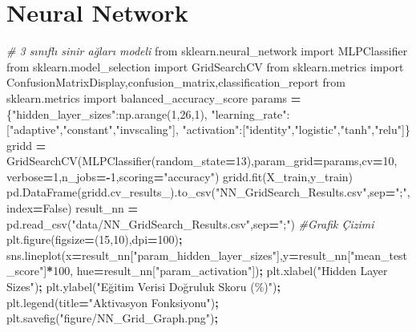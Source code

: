 \documentclass[12pt,twoside]{deuthesis}
\newenvironment{Shaded}{\begin{snugshade}}{\end{snugshade}}
\newcommand{\CommentTok}[1]{\textcolor[rgb]{0.56,0.35,0.01}{\textit{#1}}}
\newcommand{\DecValTok}[1]{\textcolor[rgb]{0.00,0.00,0.81}{#1}}
\newcommand{\ImportTok}[1]{#1}
\newcommand{\NormalTok}[1]{#1}
\newcommand{\OperatorTok}[1]{\textcolor[rgb]{0.81,0.36,0.00}{\textbf{#1}}}
\newcommand{\StringTok}[1]{\textcolor[rgb]{0.31,0.60,0.02}{#1}}
\newcommand{\VariableTok}[1]{\textcolor[rgb]{0.00,0.00,0.00}{#1}}
\begin{document}
\hypertarget{neural-network}{%
\section{Neural Network}\label{neural-network}}

\scriptsize
\begin{Shaded}
\begin{Highlighting}[]
\CommentTok{\# 3 sınıflı sinir ağları modeli}
\ImportTok{from}\NormalTok{ sklearn.neural\_network }\ImportTok{import}\NormalTok{ MLPClassifier}
\ImportTok{from}\NormalTok{ sklearn.model\_selection }\ImportTok{import}\NormalTok{ GridSearchCV}
\ImportTok{from}\NormalTok{ sklearn.metrics }\ImportTok{import}\NormalTok{ ConfusionMatrixDisplay,confusion\_matrix,classification\_report}
\ImportTok{from}\NormalTok{ sklearn.metrics }\ImportTok{import}\NormalTok{ balanced\_accuracy\_score}
\NormalTok{params }\OperatorTok{=}\NormalTok{ \{}\StringTok{"hidden\_layer\_sizes"}\NormalTok{:np.arange(}\DecValTok{1}\NormalTok{,}\DecValTok{26}\NormalTok{,}\DecValTok{1}\NormalTok{),}
          \StringTok{"learning\_rate"}\NormalTok{:[}\StringTok{"adaptive"}\NormalTok{,}\StringTok{"constant"}\NormalTok{,}\StringTok{"invscaling"}\NormalTok{],}
          \StringTok{"activation"}\NormalTok{:[}\StringTok{"identity"}\NormalTok{,}\StringTok{"logistic"}\NormalTok{,}\StringTok{"tanh"}\NormalTok{,}\StringTok{"relu"}\NormalTok{]\}}
\NormalTok{gridd }\OperatorTok{=}\NormalTok{ GridSearchCV(MLPClassifier(random\_state}\OperatorTok{=}\DecValTok{13}\NormalTok{),param\_grid}\OperatorTok{=}\NormalTok{params,cv}\OperatorTok{=}\DecValTok{10}\NormalTok{,}
\NormalTok{                                   verbose}\OperatorTok{=}\DecValTok{1}\NormalTok{,n\_jobs}\OperatorTok{={-}}\DecValTok{1}\NormalTok{,scoring}\OperatorTok{=}\StringTok{"accuracy"}\NormalTok{)}
\NormalTok{gridd.fit(X\_train,y\_train)                                  }
\NormalTok{pd.DataFrame(gridd.cv\_results\_).to\_csv(}\StringTok{"NN\_GridSearch\_Results.csv"}\NormalTok{,sep}\OperatorTok{=}\StringTok{";"}\NormalTok{,index}\OperatorTok{=}\VariableTok{False}\NormalTok{)}
\NormalTok{result\_nn }\OperatorTok{=}\NormalTok{ pd.read\_csv(}\StringTok{"data/NN\_GridSearch\_Results.csv"}\NormalTok{,sep}\OperatorTok{=}\StringTok{";"}\NormalTok{)}
\CommentTok{\#Grafik Çizimi}
\NormalTok{plt.figure(figsize}\OperatorTok{=}\NormalTok{(}\DecValTok{15}\NormalTok{,}\DecValTok{10}\NormalTok{),dpi}\OperatorTok{=}\DecValTok{100}\NormalTok{)}\OperatorTok{;}
\NormalTok{sns.lineplot(x}\OperatorTok{=}\NormalTok{result\_nn[}\StringTok{"param\_hidden\_layer\_sizes"}\NormalTok{],y}\OperatorTok{=}\NormalTok{result\_nn[}\StringTok{"mean\_test\_score"}\NormalTok{]}\OperatorTok{*}\DecValTok{100}\NormalTok{,}
\NormalTok{             hue}\OperatorTok{=}\NormalTok{result\_nn[}\StringTok{"param\_activation"}\NormalTok{])}\OperatorTok{;}
\NormalTok{plt.xlabel(}\StringTok{"Hidden Layer Sizes"}\NormalTok{)}\OperatorTok{;}
\NormalTok{plt.ylabel(}\StringTok{"Eğitim Verisi Doğruluk Skoru (\%)"}\NormalTok{)}\OperatorTok{;}
\NormalTok{plt.legend(title}\OperatorTok{=}\StringTok{"Aktivasyon Fonksiyonu"}\NormalTok{)}\OperatorTok{;}
\NormalTok{plt.savefig(}\StringTok{"figure/NN\_Grid\_Graph.png"}\NormalTok{)}\OperatorTok{;}
\end{Highlighting}
\end{Shaded}
\end{document}
